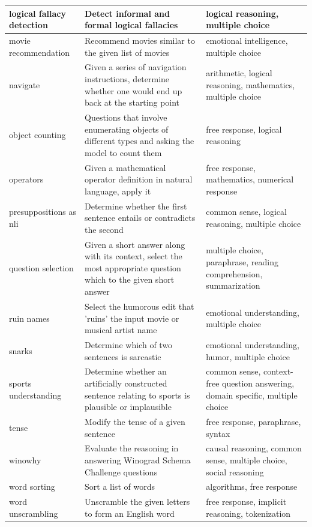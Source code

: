 \begin{table}[H]
\begin{tabular}{m{2.5cm}m{5.5cm}m{5cm}}
\midrule
logical fallacy detection & Detect informal and formal logical fallacies & logical reasoning, multiple choice \\
\midrule
movie recommendation & Recommend movies similar to the given list of movies & emotional intelligence, multiple choice \\
\midrule
navigate & Given a series of navigation instructions, determine whether one would end up back at the starting point & arithmetic, logical reasoning, mathematics, multiple choice\\
\midrule
object counting & Questions that involve enumerating objects of different types and asking the model to count them & free response, logical reasoning \\
\midrule
operators & Given a mathematical operator definition in natural language, apply it & free response, mathematics, numerical response \\
\midrule
presuppositions as nli & Determine whether the first sentence entails or contradicts the second & common sense, logical reasoning, multiple choice \\
\midrule
question selection & Given a short answer along with its context, select the most appropriate question which to the given short answer & multiple choice, paraphrase, reading comprehension, summarization \\
\midrule
ruin names & Select the humorous edit that 'ruins' the input movie or musical artist name &    emotional understanding, multiple choice \\
\midrule
snarks & Determine which of two sentences is sarcastic & emotional understanding, humor, multiple choice \\
\midrule
sports understanding & Determine whether an artificially constructed sentence relating to sports is plausible or implausible & common sense, context-free question answering, domain specific, multiple choice \\
\midrule
tense & Modify the tense of a given sentence & free response, paraphrase, syntax \\
\midrule
winowhy & Evaluate the reasoning in answering Winograd Schema Challenge questions & causal reasoning, common sense, multiple choice, social reasoning \\
\midrule
word sorting & Sort a list of words & algorithms, free response \\
\midrule
word unscrambling & Unscramble the given letters to form an English word & free response, implicit reasoning, tokenization \\
\bottomrule
\end{tabular}
\end{table}


